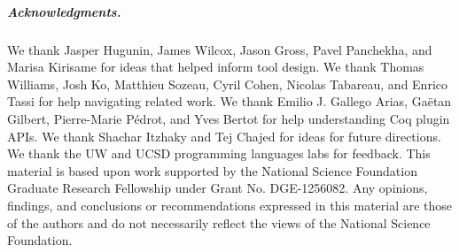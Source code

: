 \subparagraph*{Acknowledgments.}
We thank Jasper Hugunin, James Wilcox, Jason Gross, Pavel Panchekha, and Marisa Kirisame for
ideas that helped inform tool design. We thank Thomas Williams, Josh Ko,
Matthieu Sozeau, Cyril Cohen, Nicolas Tabareau, and Enrico Tassi for help
navigating related work. We thank Emilio J. Gallego Arias, Ga\"{e}tan Gilbert, Pierre-Marie P\'{e}drot, and Yves Bertot
for help understanding Coq plugin APIs.
We thank Shachar Itzhaky and Tej Chajed for ideas for future directions.
We thank the UW and UCSD programming languages labs for feedback.
This material is based upon work supported by the National Science Foundation Graduate Research Fellowship under Grant No. DGE-1256082.
Any opinions, findings, and conclusions or recommendations expressed in this material are those of the 
authors and do not necessarily reflect the views of the National Science Foundation.


